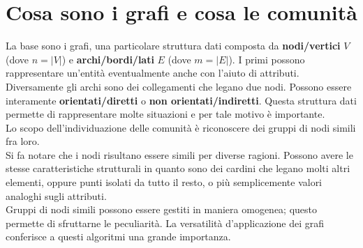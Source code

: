 \section{Cosa sono i grafi e cosa le comunità}
La base sono i grafi, una particolare struttura dati composta da \textbf{nodi/vertici} $V$ (dove $n=|V|$) e \textbf{archi/bordi/lati} $E$ (dove $m=|E|$). I primi possono rappresentare un'entità eventualmente anche con l'aiuto di attributi. Diversamente gli archi sono dei collegamenti che legano due nodi. Possono essere interamente \textbf{orientati/diretti} o \textbf{non orientati/indiretti}. Questa struttura dati permette di rappresentare molte situazioni e per tale motivo è importante.\\
Lo scopo dell'individuazione delle comunità è riconoscere dei gruppi di nodi simili fra loro.\\
Si fa notare che i nodi risultano essere simili per diverse ragioni. Possono avere le stesse caratteristiche strutturali in quanto sono dei cardini che legano molti altri elementi, oppure punti isolati da tutto il resto, o più semplicemente  valori analoghi sugli attributi.\\
Gruppi di nodi simili possono essere gestiti in maniera omogenea; questo permette di sfruttarne le peculiarità. La versatilità d'applicazione dei grafi conferisce a questi algoritmi una grande importanza.
%
